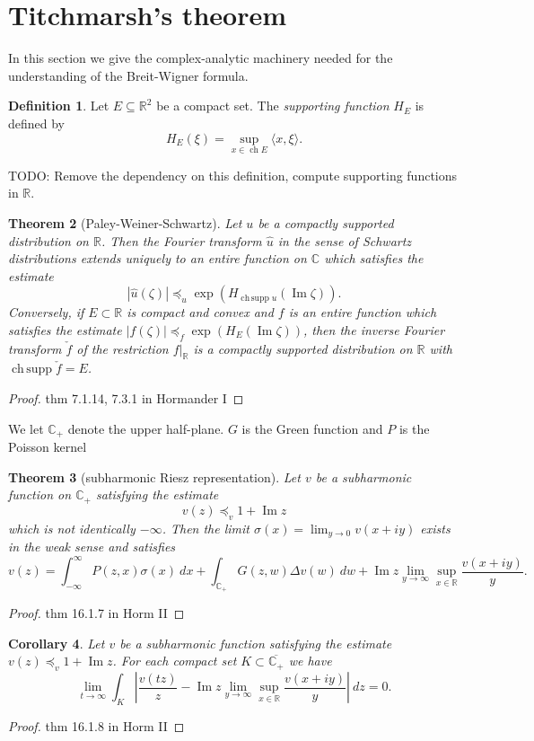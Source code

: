 \documentclass[12pt]{report}
\newcommand{\RR}{\mathbb{R}}
\newcommand{\CC}{\mathbb{C}}
\DeclareMathOperator{\ch}{ch}
\DeclareMathOperator*{\chsupp}{ch\,supp}
\renewcommand{\Im}{\operatorname{Im}}
\newcommand{\dfn}[1]{\emph{#1}\index{#1}}
\newtheorem{theorem}{Theorem}[chapter]
\newtheorem{corollary}[theorem]{Corollary}
\theoremstyle{definition}
\newtheorem{definition}[theorem]{Definition}
\begin{document}
\section{Titchmarsh's theorem}
In this section we give the complex-analytic machinery needed for the understanding of the Breit-Wigner formula.

\begin{definition}
    Let $E \subseteq \RR^2$ be a compact set. The \dfn{supporting function} $H_E$ is defined by
    $$H_E(\xi) = \sup_{x \in \ch E} \langle x, \xi \rangle.$$
\end{definition}
    TODO: Remove the dependency on this definition, compute supporting functions in $\RR$.

\begin{theorem}[Paley-Weiner-Schwartz]
    Let $u$ be a compactly supported distribution on $\RR$. Then the Fourier transform $\hat u$ in the sense of Schwartz distributions extends uniquely to an entire function on $\CC$ which satisfies the estimate
    $$|\hat u(\zeta)| \preceq_u \exp(H_{\chsupp u}(\Im \zeta)).$$
    Conversely, if $E \subset \RR$ is compact and convex and $f$ is an entire function which satisfies the estimate $|f(\zeta)| \preceq_f \exp(H_E(\Im \zeta))$, then the inverse Fourier transform $\check f$ of the restriction $f|_\RR$ is a compactly supported distribution on $\RR$ with $\chsupp \check f = E$.
\end{theorem}
\begin{proof}
    thm 7.1.14, 7.3.1 in Hormander I
\end{proof}

We let $\CC_+$ denote the upper half-plane. $G$ is the Green function and $P$ is the Poisson kernel
\begin{theorem}[subharmonic Riesz representation]
    Let $v$ be a subharmonic function on $\CC_+$ satisfying the estimate
    $$v(z) \preceq_v 1 + \Im z$$
    which is not identically $-\infty$. Then the limit $\sigma(x) = \lim_{y \to 0} v(x + iy)$ exists in the weak sense and satisfies
    $$v(z) = \int_{-\infty}^\infty P(z, x) \sigma(x) ~dx + \int_{\CC_+} G(z, w) \Delta v(w) ~dw + \Im z \lim_{y \to \infty} \sup_{x \in \RR} \frac{v(x + iy)}{y}.$$
\end{theorem}
\begin{proof}
    thm 16.1.7 in Horm II
\end{proof}

\begin{corollary}
    Let $v$ be a subharmonic function satisfying the estimate $v(z) \preceq_v 1 + \Im z$. For each compact set $K \subset \overline{\CC_+}$ we have
$$\lim_{t \to \infty} \int_K \left|\frac{v(tz)}{z} - \Im z \lim_{y \to \infty} \sup_{x \in \RR} \frac{v(x + iy)}{y}\right| ~dz = 0.$$
\end{corollary}
\begin{proof}
    thm 16.1.8 in Horm II
\end{proof}
\end{document}
